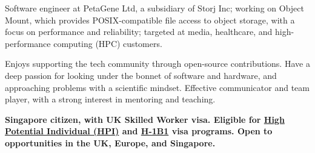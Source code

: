 

\begin{cvparagraph}

Software engineer at PetaGene Ltd, a subsidiary of Storj Inc; working on Object Mount, which provides POSIX-compatible file access to object storage, with a focus on performance and reliability; targeted at media, healthcare, and high-performance computing (HPC) customers.

Enjoys supporting the tech community through open-source contributions. Have a deep passion for looking under the bonnet of software and hardware, and approaching problems with a scientific mindset. Effective communicator and team player, with a strong interest in mentoring and teaching.

\textbf{Singapore citizen, with UK Skilled Worker visa. Eligible for \href{https://www.gov.uk/high-potential-individual-visa}{High Potential Individual (HPI)} and \href{https://www.dol.gov/agencies/whd/immigration/h1b1}{H-1B1} visa programs. Open to opportunities in the UK, Europe, and Singapore.}
\end{cvparagraph}
